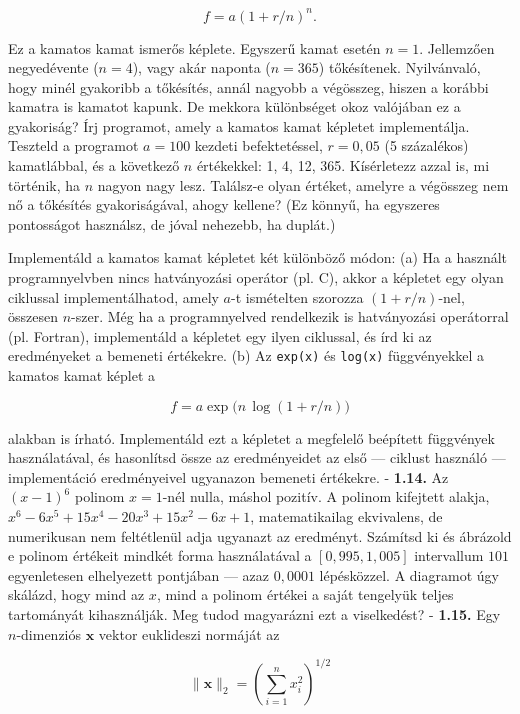 \documentclass[
  magyar,
  11pt]{article}
\providecommand{\boldsymbol}[1]{\mathbf{#1}}
\begin{document}
\[f = a(1 + r/n)^n.\]

Ez a kamatos kamat ismerős képlete. Egyszerű kamat esetén \(n = 1\).
Jellemzően negyedévente (\(n = 4\)), vagy akár naponta (\(n = 365\))
tőkésítenek. Nyilvánvaló, hogy minél gyakoribb a tőkésítés, annál
nagyobb a végösszeg, hiszen a korábbi kamatra is kamatot kapunk. De
mekkora különbséget okoz valójában ez a gyakoriság? Írj programot, amely
a kamatos kamat képletet implementálja. Teszteld a programot \(a = 100\)
kezdeti befektetéssel, \(r = 0{,}05\) (5 százalékos) kamatlábbal, és a
következő \(n\) értékekkel: 1, 4, 12, 365. Kísérletezz azzal is, mi
történik, ha \(n\) nagyon nagy lesz. Találsz-e olyan értéket, amelyre a
végösszeg nem nő a tőkésítés gyakoriságával, ahogy kellene? (Ez könnyű,
ha egyszeres pontosságot használsz, de jóval nehezebb, ha duplát.)

Implementáld a kamatos kamat képletet két különböző módon: (a) Ha a
használt programnyelvben nincs hatványozási operátor (pl. C), akkor a
képletet egy olyan ciklussal implementálhatod, amely \(a\)-t ismételten
szorozza \((1 + r/n)\)-nel, összesen \(n\)-szer. Még ha a programnyelved
rendelkezik is hatványozási operátorral (pl. Fortran), implementáld a
képletet egy ilyen ciklussal, és írd ki az eredményeket a bemeneti
értékekre. (b) Az \texttt{exp(x)} és \texttt{log(x)} függvényekkel a
kamatos kamat képlet a

\[f = a \exp\bigl(n\,\log(1 + r/n)\bigr)\]

alakban is írható. Implementáld ezt a képletet a megfelelő beépített
függvények használatával, és hasonlítsd össze az eredményeidet az első
--- ciklust használó --- implementáció eredményeivel ugyanazon bemeneti
értékekre. - \textbf{1.14.} Az \((x - 1)^6\) polinom \(x = 1\)-nél
nulla, máshol pozitív. A polinom kifejtett alakja,
\(x^6 - 6x^5 + 15x^4 - 20x^3 + 15x^2 - 6x + 1\), matematikailag
ekvivalens, de numerikusan nem feltétlenül adja ugyanazt az eredményt.
Számítsd ki és ábrázold e polinom értékeit mindkét forma használatával a
\([0{,}995, 1{,}005]\) intervallum \(101\) egyenletesen elhelyezett
pontjában --- azaz \(0{,}0001\) lépésközzel. A diagramot úgy skálázd,
hogy mind az \(x\), mind a polinom értékei a saját tengelyük teljes
tartományát kihasználják. Meg tudod magyarázni ezt a viselkedést? -
\textbf{1.15.} Egy \(n\)-dimenziós \(\boldsymbol{x}\) vektor euklideszi
normáját az

\[\|\boldsymbol{x}\|_2 = \left(\sum_{i=1}^n x_i^2\right)^{1/2}\]
\end{document}
